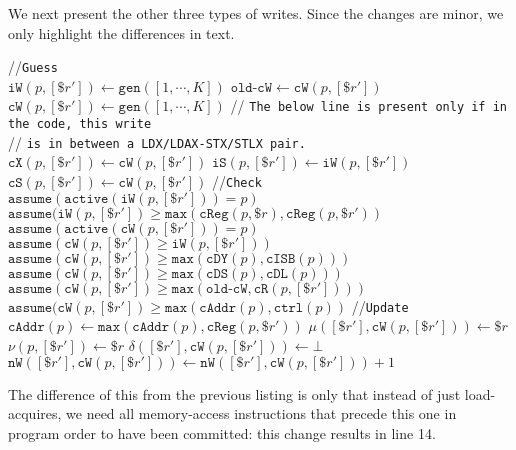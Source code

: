 \documentclass{article}
\newcommand{\var}{\texttt}
\begin{document}
We next present the other three types of writes. Since the changes are minor, we only highlight the differences in text.
\begin{algorithm}[H]
  \SetAlgoLined
  //\var{Guess}\\
  $\var{iW}(p,[\$r']) \gets \var{gen}([1,\cdots,K])$\;
  $\var{old-cW} \gets \var{cW}(p,[\$r'])$\;
  $\var{cW}(p,[\$r']) \gets \var{gen}([1,\cdots,K])$\;
  // \var{The below line is present only if in the code, this write}\\
  // \var{is in between a LDX/LDAX-STX/STLX pair.}\\
  $\var{cX}(p,[\$r']) \gets \var{cW}(p,[\$r'])$\;
  $\var{iS}(p,[\$r']) \gets \var{iW}(p,[\$r'])$\;
  $\var{cS}(p,[\$r']) \gets \var{cW}(p,[\$r'])$\;
  //\var{Check}\\
  $\var{assume}(\var{active}(\var{iW}(p,[\$r'])) = p)$\;
  $\var{assume}(\var{iW}(p,[\$r']) \geq \var{max}(\var{cReg}(p,\$r),\var{cReg}(p,\$r'))$\;
  \For{$\$x \in \mathcal{X}$}{
    $\var{assume}(\var{cW}(p,[\$r']) \geq \var{max}(\var{cR}(p,x),\var{cW}(p,x)))$\;
  }
  $\var{assume}(\var{active}(\var{cW}(p,[\$r'])) = p)$\;
  $\var{assume}(\var{cW}(p,[\$r']) \geq \var{iW}(p,[\$r']))$\;
  $\var{assume}(\var{cW}(p,[\$r']) \geq \var{max}(\var{cDY}(p), \var{cISB}(p)))$\;
  $\var{assume}(\var{cW}(p,[\$r']) \geq \var{max}(\var{cDS}(p),\var{cDL}(p)))$\;
  $\var{assume}(\var{cW}(p,[\$r']) \geq \var{max}(\var{old-cW},\var{cR}(p,[\$r'])))$\;
  $\var{assume}(\var{cW}(p,[\$r']) \geq \var{max}(\var{cAddr}(p),\var{ctrl}(p))$\;
  //\var{Update}\\
  $\var{cAddr}(p) \gets \var{max}(\var{cAddr}(p), \var{cReg}(p,\$r'))$\;
  $\mu([\$r'],\var{cW}(p,[\$r'])) \gets \$r$\;
  $\nu(p,[\$r']) \gets \$r$\;
  $\delta([\$r'],\var{cW}(p,[\$r'])) \gets \bot$\;
  $\var{nW}([\$r'],\var{cW}(p,[\$r'])) \gets \var{nW}([\$r'],\var{cW}(p,[\$r'])) + 1$\;
  \caption{$\llbracket \var{STL } [\$r'] \leftarrow \$r \rrbracket_K^{p,\var{STL}}$}
\end{algorithm}
The difference of this from the previous listing is only that instead of just load-acquires, we need all memory-access instructions that precede this one in program order to have been committed: this change results in line 14.\\
\end{document}
